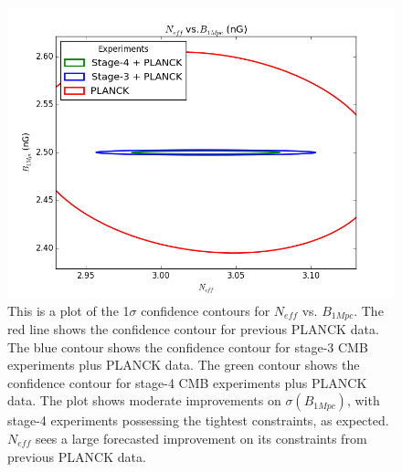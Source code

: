 {{\begin{figure}[h]
\centering
\includegraphics[scale=0.8]{images/contours/neff.png}
\caption{This is a plot of the 1$\sigma$ confidence contours for $N_{eff}$ vs. $B_{1Mpc}$. The red line shows the confidence contour for previous PLANCK data. The blue contour shows the confidence contour for stage-3 CMB experiments plus PLANCK data. The green contour shows the confidence contour for stage-4 CMB experiments plus PLANCK data. The plot shows moderate improvements on $\sigma(B_{1Mpc})$, with stage-4 experiments possessing the tightest constraints, as expected. $N_{eff}$ sees a large forecasted improvement on its constraints from previous PLANCK data. }
\label{fig:neff}
\end{figure}

}}
